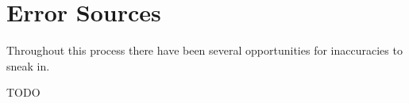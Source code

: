 \section{Error Sources}

Throughout this process there have been several opportunities for inaccuracies to sneak in. 

TODO